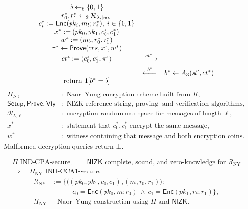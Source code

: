 \documentclass[12pt,a4paper]{article}
\begin{document}
\begin{definition}
\[\begin{array}{c@{\quad}c@{\quad}c}
b\leftarrow_{\$}\{0,1\}&&\\
r_0^*,r_1^*\leftarrow_{\$}\mathcal R_{\lambda,|m_b|}&&\\
c_i^*:=\mathsf{Enc}(pk_i,m_b;r_i^*),\ i\in\{0,1\}&&\\
x^*:=(pk_0,pk_1,c_0^*,c_1^*)&&\\
w^*:=(m_b,r_0^*,r_1^*)&&\\
\pi^*\leftarrow\mathsf{Prove}(crs,x^*,w^*)&&\\
ct^*:=(c_0^*,c_1^*,\pi^*)
&\xrightarrow{\ ct^*\ }&\\[5pt]
&\xleftarrow{\ b^*\ }&b^*\leftarrow A_3(st',ct^*)\\
\mathrm{return}\ \mathbf1[b^*=b]&&
\end{array}
\]
\endgroup
\[
\begin{aligned}
\Pi_{\mathrm{NY}}&:\text{ Naor--Yung encryption scheme built from }\Pi,\\
\mathsf{Setup},\mathsf{Prove},\mathsf{Vfy}&:\text{ NIZK reference-string, proving, and verification algorithms},\\
\mathcal R_{\lambda,\ell}&:\text{ encryption randomness space for messages of length }\ell,\\
x^*&:\text{ statement that }c_0^*,c_1^*\text{ encrypt the same message},\\
w^*&:\text{ witness containing that message and both encryption coins}.
\end{aligned}
\]
Malformed decryption queries return $\bot$.
\end{definition}

\clearpage
\begin{theorem}
\[
\begin{gathered}
\Pi\text{ IND-CPA-secure},\qquad
\mathsf{NIZK}\text{ complete, sound, and zero-knowledge for }R_{\mathrm{NY}}\\
\Longrightarrow\quad
\Pi_{\mathrm{NY}}\text{ IND-CCA1-secure}.
\end{gathered}
\]
\[
\begin{aligned}
R_{\mathrm{NY}}&:=\bigl\{\bigl((pk_0,pk_1,c_0,c_1),(m,r_0,r_1)\bigr):\\
&\hspace{3em}c_0=\mathsf{Enc}(pk_0,m;r_0)\ \land\
c_1=\mathsf{Enc}(pk_1,m;r_1)\bigr\},\\
\Pi_{\mathrm{NY}}&:\text{ Naor--Yung construction using }\Pi\text{ and }\mathsf{NIZK}.
\end{aligned}
\]
\end{theorem}
\end{document}
